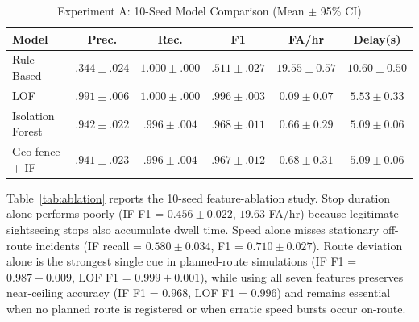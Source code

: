 \documentclass[conference]{IEEEtran}
\begin{document}
\begin{table}[t]
\centering
\caption{Experiment A: 10-Seed Model Comparison (Mean $\pm$ 95\% CI)}
\label{tab:exp_a}
\scriptsize
\begin{tabular}{@{}lccccc@{}}
\toprule
\textbf{Model} & \textbf{Prec.} & \textbf{Rec.} & \textbf{F1} & \textbf{FA/hr} & \textbf{Delay(s)} \\
\midrule
Rule-Based & $.344 \pm .024$ & $1.000 \pm .000$ & $.511 \pm .027$ & $19.55 \pm 0.57$ & $10.60 \pm 0.50$ \\
LOF & $.991 \pm .006$ & $1.000 \pm .000$ & $.996 \pm .003$ & $0.09 \pm 0.07$ & $5.53 \pm 0.33$ \\
Isolation Forest & $.942 \pm .022$ & $.996 \pm .004$ & $.968 \pm .011$ & $0.66 \pm 0.29$ & $5.09 \pm 0.06$ \\
Geo-fence + IF & $.941 \pm .023$ & $.996 \pm .004$ & $.967 \pm .012$ & $0.68 \pm 0.31$ & $5.09 \pm 0.06$ \\
\bottomrule
\end{tabular}
\end{table}

Table~\ref{tab:ablation} reports the 10-seed feature-ablation study. Stop duration alone performs poorly (IF F1 = $0.456 \pm 0.022$, $19.63$ FA/hr) because legitimate sightseeing stops also accumulate dwell time. Speed alone misses stationary off-route incidents (IF recall = $0.580 \pm 0.034$, F1 = $0.710 \pm 0.027$). Route deviation alone is the strongest single cue in planned-route simulations (IF F1 = $0.987 \pm 0.009$, LOF F1 = $0.999 \pm 0.001$), while using all seven features preserves near-ceiling accuracy (IF F1 = $0.968$, LOF F1 = $0.996$) and remains essential when no planned route is registered or when erratic speed bursts occur on-route.
\end{document}
